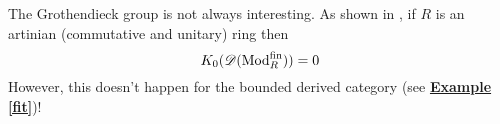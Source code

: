 %
%
%
%
%
%

\begin{exmp}
The Grothendieck group is not always interesting. As shown in \cite{miy}, if $R$ is an artinian (commutative and unitary) ring then $$K_0(\mathscr{D}(\textnormal{Mod}_R^{\textnormal{fin}}))=0$$
However, this doesn't happen for the bounded derived category (see \hyperref[fit]{\textbf{Example \ref*{fit}}})!
\end{exmp}

